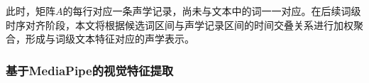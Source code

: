 此时，矩阵$A$的每行对应一条声学记录，尚未与文本中的词一一对应。在后续词级时序对齐阶段，本文将根据候选词区间与声学记录区间的时间交叠关系进行加权聚合，形成与词级文本特征对应的声学表示。








\subsubsection{基于MediaPipe的视觉特征提取}

